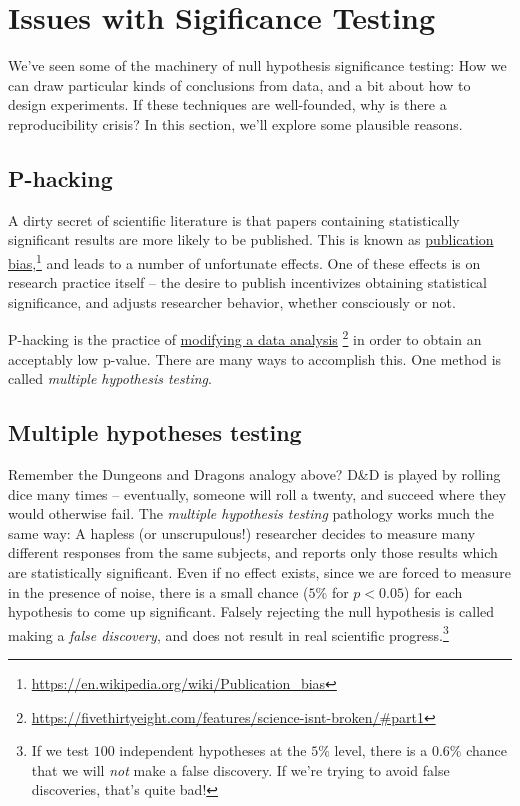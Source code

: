 \documentclass{tufte-handout}
\begin{document}
\section{Issues with Sigificance Testing}
\label{sec:org72a6f85}
We've seen some of the machinery of null hypothesis significance testing: How we
can draw particular kinds of conclusions from data, and a bit about how to
design experiments. If these techniques are well-founded, why is there a
reproducibility crisis? In this section, we'll explore some plausible reasons.

\subsection{P-hacking}
\label{sec:org349677d}
A dirty secret of scientific literature is that papers containing statistically
significant results are more likely to be published. This is known as
\href{https://en.wikipedia.org/wiki/Publication\_bias}{publication bias},\footnote{\url{https://en.wikipedia.org/wiki/Publication\_bias}} and leads
to a number of unfortunate effects. One of these effects is on research practice
itself -- the desire to publish incentivizes obtaining statistical significance,
and adjusts researcher behavior, whether consciously or not.

P-hacking is the practice of \href{https://fivethirtyeight.com/features/science-isnt-broken/\#part1}{modifying a data analysis}
\footnote{\url{https://fivethirtyeight.com/features/science-isnt-broken/\#part1}} in order
to obtain an acceptably low p-value. There are many ways to accomplish this. One
method is called \emph{multiple hypothesis testing}.

\subsection{Multiple hypotheses testing}
\label{sec:org4fb13a2}
Remember the Dungeons and Dragons analogy above? D\&D is played by rolling dice
many times -- eventually, someone will roll a twenty, and succeed where they
would otherwise fail. The \emph{multiple hypothesis testing} pathology works much the
same way: A hapless (or unscrupulous!) researcher decides to measure many
different responses from the same subjects, and reports only those results which
are statistically significant. Even if no effect exists, since we are forced to
measure in the presence of noise, there is a small chance (\(5\%\) for \(p<0.05\))
for each hypothesis to come up significant. Falsely rejecting the null
hypothesis is called making a \emph{false discovery}, and does not result in real
scientific progress.\footnote{If we test \(100\) independent hypotheses at the \(5\%\)
level, there is a \(0.6\%\) chance that we will \emph{not} make a false discovery. If
we're trying to avoid false discoveries, that's quite bad!}
\end{document}
